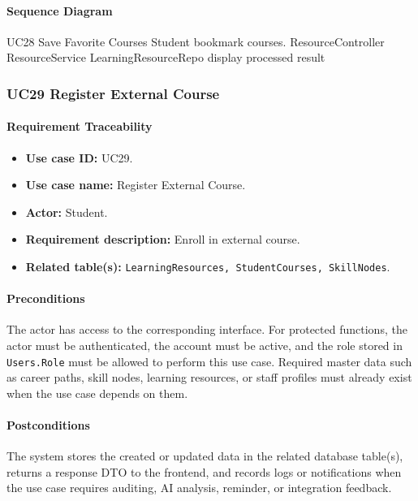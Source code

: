 \paragraph{Sequence Diagram}

\SequenceDiagram
{UC28 Save Favorite Courses}
{Student}
{bookmark courses.}
{ResourceController}
{ResourceService}
{LearningResourceRepo}
{display processed result}

\subsubsection{UC29 Register External Course}

\paragraph{Requirement Traceability}

\begin{itemize}
    \item \textbf{Use case ID:} UC29.
    \item \textbf{Use case name:} Register External Course.
    \item \textbf{Actor:} Student.
    \item \textbf{Requirement description:} Enroll in external course.
    \item \textbf{Related table(s):} \texttt{LearningResources, StudentCourses, SkillNodes}.
\end{itemize}

\paragraph{Preconditions}

The actor has access to the corresponding interface. For protected functions, the actor must be authenticated, the account must be active, and the role stored in \texttt{Users.Role} must be allowed to perform this use case. Required master data such as career paths, skill nodes, learning resources, or staff profiles must already exist when the use case depends on them.

\paragraph{Postconditions}

The system stores the created or updated data in the related database table(s), returns a response DTO to the frontend, and records logs or notifications when the use case requires auditing, AI analysis, reminder, or integration feedback.

